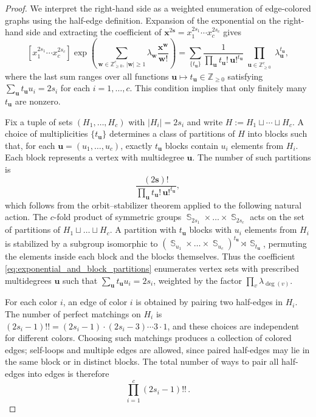 \documentclass[a4paper,oneside]{amsart}
\newcommand{\bb}[1]{\boldsymbol{#1}}
\numberwithin{theorem}{section}
\theoremstyle{remark}
\newcommand{\Z}{\mathbb{Z}}
\DeclareMathOperator{\Sym}{\mathbb{S}}
\begin{document}
\begin{proof}
We interpret the right-hand side as a weighted enumeration of edge-colored graphs using the half-edge definition. Expansion of the exponential on the right-hand side and extracting the coefficient of $\bb x^{2\bb s}=x_1^{2s_1}\cdots x_c^{2s_c}$ gives
\begin{equation}\label{eq:exponential_and_block_partitions}
    [x_1^{2s_1}\cdots x_c^{2s_c}]
    \exp\left( \sum_{\bb{w}\in \Z^c_{\geq 0},\, |\bb{w}| \geq 1} \lambda_{\bb{w}} \frac{\bb{x}^{\bb{w}}}{\bb{w}!} \right)
    = 
    \sum_{\{t_{\bb{u}}\}} 
    \frac{1}{\prod_{\bb{u}} t_{\bb{u}}!\, \bb{u}!^{t_{\bb{u}}}} \prod_{\substack{\bb{u}\in \Z^c_{\geq 0}}} \lambda_{\bb{u}}^{t_{\bb{u}}},
\end{equation}
where the last sum ranges over all functions
$\bb u\mapsto t_{\bb u}\in\Z_{\ge0}$ satisfying
$\sum_{\bb u}t_{\bb u}u_i=2s_i$ for each $i=1,\dots,c$.
This condition implies that only finitely many $t_{\bb u}$ are nonzero.

Fix a tuple of sets $(H_1,\ldots,H_c)$ with $|H_i|=2s_i$ and write $H:=H_1\sqcup\cdots\sqcup H_c$.
A choice of multiplicities $\{t_{\bb u}\}$ determines a class of partitions of $H$ into blocks such that, for each $\bb u=(u_1,\dots,u_c)$, exactly $t_{\bb u}$ blocks
contain $u_i$ elements from $H_i$.
Each block represents a vertex with multidegree $\bb u$.
The number of such partitions is
\begin{equation}\label{eq:block_partitions}
\frac{(2\bb s)!}{\prod_{\bb u}t_{\bb u}!\,\bb u!^{t_{\bb u}}},
\end{equation}
which follows from the orbit--stabilizer theorem applied to the following natural action. The $c$-fold product of symmetric groups $\Sym_{2s_1} \times \dots \times \Sym_{2s_c}$ acts  on the set of partitions of $H_1 \sqcup \dots \sqcup H_c$. A partition with $t_{\bb{u}}$ blocks with $u_i$ elements from $H_i$ is stabilized by a subgroup isomorphic to $(\Sym_{u_1} \times \dots \times \Sym_{u_c})^{t_{\bb{u}}} \rtimes \Sym_{t_{\bb{u}}}$, permuting the elements inside each block and the blocks themselves.
Thus the coefficient \eqref{eq:exponential_and_block_partitions} enumerates vertex sets with
prescribed multidegrees $\bb u$ such that $\sum_{\bb u}t_{\bb u}u_i=2s_i$, weighted by the factor
$\prod_v\lambda_{\deg(v)}$.

For each color $i$, an edge of color $i$ is obtained by pairing two half-edges in
$H_i$.
The number of perfect matchings on $H_i$ is $(2s_i-1)!!=(2s_i-1) \cdot (2s_i-3) \cdots 3 \cdot 1$, and these choices are
independent for different colors.
Choosing such matchings produces a collection of colored edges; self-loops and
multiple edges are allowed, since paired half-edges may lie in the same block or in
distinct blocks.
The total number of ways to pair all half-edges into edges is therefore
\[
\prod_{i=1}^c(2s_i-1)!! \, .
\]


\end{proof}
\end{document}
